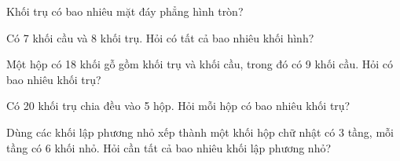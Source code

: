\begin{ex} %
Khối trụ có bao nhiêu mặt đáy phẳng hình tròn?
\end{ex}

\begin{ex} %
Có 7 khối cầu và 8 khối trụ. Hỏi có tất cả bao nhiêu khối hình?
\end{ex}

\begin{ex} %
Một hộp có 18 khối gỗ gồm khối trụ và khối cầu, trong đó có 9 khối cầu. Hỏi có bao nhiêu khối trụ?
\end{ex}

\begin{ex} %
Có 20 khối trụ chia đều vào 5 hộp. Hỏi mỗi hộp có bao nhiêu khối trụ?
\end{ex}

\begin{ex} %
Dùng các khối lập phương nhỏ xếp thành một khối hộp chữ nhật có 3 tầng, mỗi tầng có 6 khối nhỏ. Hỏi cần tất cả bao nhiêu khối lập phương nhỏ?
\end{ex}
